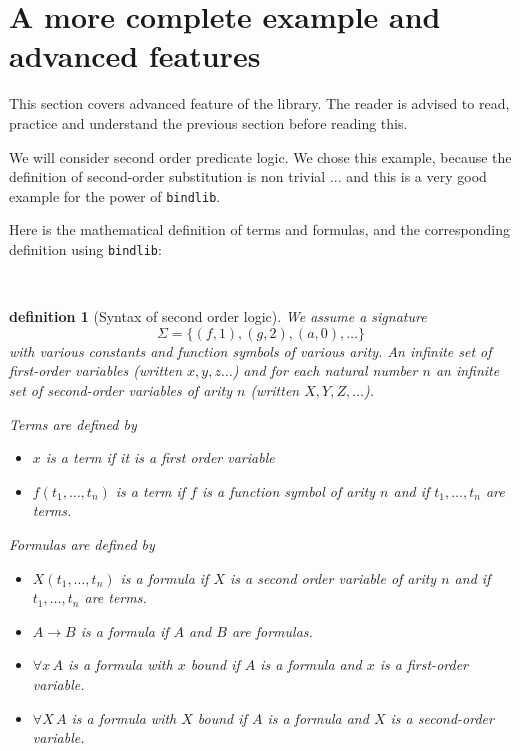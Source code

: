 \documentclass[11pt]{article}
\begin{document}
\section{A more complete example and advanced features}

This section covers advanced feature of the library. The reader is
advised to read, practice and understand the previous section before
reading this.

We will consider second order predicate logic.
We chose this example, because the definition of second-order
substitution is non trivial ... and this is a very good example for
the power of \verb#bindlib#.

Here is the mathematical definition of terms and formulas, and the
corresponding definition using \verb#bindlib#:

\newtheorem{definition}{definition}\
\begin{definition}[Syntax of second order logic]\rm
We assume a signature
$$\Sigma = \{(f,1), (g,2), (a,0), \dots\}$$ with various
constants and function symbols of
various arity. An infinite set of first-order variables (written
$x,y,z\dots$) and for each natural number $n$ an infinite set of
second-order variables of arity $n$ (written $X,Y,Z,\dots$).

Terms are defined by
\begin{itemize}
\item $x$ is a term if it is a first order variable
\item $f(t_1,\dots,t_n)$ is a term if $f$ is a function symbol of
arity $n$ and if $t_1,\dots,t_n$ are terms.
\end{itemize}

Formulas are defined by
\begin{itemize}
\item $X(t_1,\dots,t_n)$ is a formula if $X$ is a second order variable of
arity $n$ and if $t_1,\dots,t_n$ are terms.
\item $A \to B$ is a formula if $A$ and $B$ are formulas.
\item $\forall x\,A$ is a formula with $x$ bound if $A$ is a formula
and $x$ is a first-order variable.
\item $\forall X\,A$ is a formula with $X$ bound if $A$ is a formula
and $X$ is a second-order variable.
\end{itemize}
\end{definition}
\end{document}
